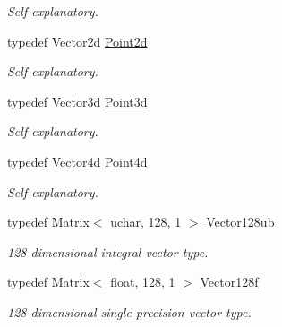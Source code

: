\begin{DoxyCompactItemize}
\begin{DoxyCompactList}\small\item\em Self-\/explanatory. \end{DoxyCompactList}\item 
\hypertarget{group___eigen_typedefs_ga17451c1ba65dc5ceb1f90e1fc710fa24}{typedef Vector2d \hyperlink{group___eigen_typedefs_ga17451c1ba65dc5ceb1f90e1fc710fa24}{Point2d}}\label{group___eigen_typedefs_ga17451c1ba65dc5ceb1f90e1fc710fa24}

\begin{DoxyCompactList}\small\item\em Self-\/explanatory. \end{DoxyCompactList}\item 
\hypertarget{group___eigen_typedefs_gaa979df133eaeb0d59bc4c11cc09324d1}{typedef Vector3d \hyperlink{group___eigen_typedefs_gaa979df133eaeb0d59bc4c11cc09324d1}{Point3d}}\label{group___eigen_typedefs_gaa979df133eaeb0d59bc4c11cc09324d1}

\begin{DoxyCompactList}\small\item\em Self-\/explanatory. \end{DoxyCompactList}\item 
\hypertarget{group___eigen_typedefs_ga78b225dff8d9416f7c193bff95436d5e}{typedef Vector4d \hyperlink{group___eigen_typedefs_ga78b225dff8d9416f7c193bff95436d5e}{Point4d}}\label{group___eigen_typedefs_ga78b225dff8d9416f7c193bff95436d5e}

\begin{DoxyCompactList}\small\item\em Self-\/explanatory. \end{DoxyCompactList}\item 
\hypertarget{group___eigen_typedefs_ga44bd1dca23704c43b473fed6540c4a81}{typedef Matrix$<$ uchar, 128, 1 $>$ \hyperlink{group___eigen_typedefs_ga44bd1dca23704c43b473fed6540c4a81}{Vector128ub}}\label{group___eigen_typedefs_ga44bd1dca23704c43b473fed6540c4a81}

\begin{DoxyCompactList}\small\item\em 128-\/dimensional integral vector type. \end{DoxyCompactList}\item 
\hypertarget{group___eigen_typedefs_ga5af1d2cf882552fe7d1f0f8c673948ad}{typedef Matrix$<$ float, 128, 1 $>$ \hyperlink{group___eigen_typedefs_ga5af1d2cf882552fe7d1f0f8c673948ad}{Vector128f}}\label{group___eigen_typedefs_ga5af1d2cf882552fe7d1f0f8c673948ad}

\begin{DoxyCompactList}\small\item\em 128-\/dimensional single precision vector type. \end{DoxyCompactList}\end{DoxyCompactItemize}
